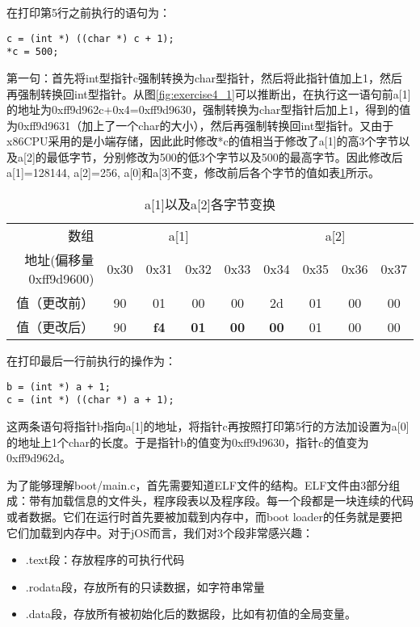 \begin{exerciseSolution}{4}
\par 在打印第5行之前执行的语句为：
\begin{lstlisting}
c = (int *) ((char *) c + 1);
*c = 500;
\end{lstlisting}
\par 第一句：首先将int型指针c强制转换为char型指针，然后将此指针值加上1，然后再强制转换回int型指针。从图\ref{fig:exercise4_1}可以推断出，在执行这一语句前a[1]的地址为0xff9d962c+0x4=0xff9d9630，强制转换为char型指针后加上1，得到的值为0xff9d9631（加上了一个char的大小），然后再强制转换回int型指针。又由于x86CPU采用的是小端存储，因此此时修改*c的值相当于修改了a[1]的高3个字节以及a[2]的最低字节，分别修改为500的低3个字节以及500的最高字节。因此修改后a[1]=128144, a[2]=256, a[0]和a[3]不变，修改前后各个字节的值如表\ref{tab:4_1}所示。
\begin{table}[htp]
    \centering
    \caption{a[1]以及a[2]各字节变换}
    \label{tab:4_1}
    \begin{tabular}{r c c c c c c c c}
        \toprule
        数组 & \multicolumn{4}{c}{a[1]} & \multicolumn{4}{c}{a[2]}\\
        \cmidrule(lr){2-5} \cmidrule(lr){6-9}
        地址(偏移量0xff9d9600) & 0x30 & 0x31 & 0x32 & 0x33 & 0x34 & 0x35 & 0x36 & 0x37 \\
        值（更改前）& 90   & 01   & 00   & 00   & 2d   & 01   & 00   & 00   \\
        值（更改后）& 90   & \textbf{f4} & \textbf{01 } & \textbf{00} & \textbf{00} & 01 & 00 & 00  \\
        \bottomrule
    \end{tabular}
\end{table}

\par 在打印最后一行前执行的操作为：
\begin{lstlisting}
b = (int *) a + 1;
c = (int *) ((char *) a + 1);
\end{lstlisting}
\par 这两条语句将指针b指向a[1]的地址，将指针c再按照打印第5行的方法加设置为a[0]的地址上1个char的长度。于是指针b的值变为0xff9d9630，指针c的值变为0xff9d962d。
\end{exerciseSolution}

\par 为了能够理解boot/main.c，首先需要知道ELF文件的结构。ELF文件由3部分组成：带有加载信息的文件头，程序段表以及程序段。每一个段都是一块连续的代码或者数据。它们在运行时首先要被加载到内存中，而boot loader的任务就是要把它们加载到内存中。对于jOS而言，我们对3个段非常感兴趣：
\begin{itemize}
    \item .text段：存放程序的可执行代码
    \item .rodata段，存放所有的只读数据，如字符串常量
    \item .data段，存放所有被初始化后的数据段，比如有初值的全局变量。
\end{itemize}

